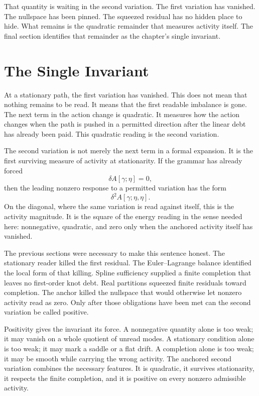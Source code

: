 That quantity is waiting in the second variation. The first variation has
vanished. The nullspace has been pinned. The squeezed residual has no hidden
place to hide. What remains is the quadratic remainder that measures
activity itself. The final section identifies that remainder as the chapter's
single invariant.

\section{The Single Invariant}

At a stationary path, the first variation has vanished. This does not mean
that nothing remains to be read. It means that the first readable imbalance
is gone. The next term in the action change is quadratic. It measures how
the action changes when the path is pushed in a permitted direction after
the linear debt has already been paid. This quadratic reading is the second
variation.

The second variation is not merely the next term in a formal expansion. It
is the first surviving measure of activity at stationarity. If the grammar
has already forced
\[
  \delta A[\gamma;\eta] = 0 ,
\]
then the leading nonzero response to a permitted variation has the form
\[
  \delta^2 A[\gamma;\eta,\eta].
\]
On the diagonal, where the same variation is read against itself, this is
the activity magnitude. It is the square of the energy reading in the sense
needed here: nonnegative, quadratic, and zero only when the anchored
activity itself has vanished.

The previous sections were necessary to make this sentence honest. The
stationary reader killed the first residual. The Euler--Lagrange balance
identified the local form of that killing. Spline sufficiency supplied a
finite completion that leaves no first-order knot debt. Real partitions
squeezed finite residuals toward completion. The anchor killed the nullspace
that would otherwise let nonzero activity read as zero. Only after those
obligations have been met can the second variation be called positive.

Positivity gives the invariant its force. A nonnegative quantity alone is
too weak; it may vanish on a whole quotient of unread modes. A stationary
condition alone is too weak; it may mark a saddle or a flat drift. A
completion alone is too weak; it may be smooth while carrying the wrong
activity. The anchored second variation combines the necessary features. It
is quadratic, it survives stationarity, it respects the finite completion,
and it is positive on every nonzero admissible activity.

